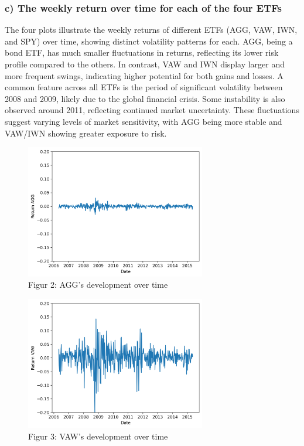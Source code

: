\documentclass{rapport}
\begin{document}
\subsubsection*{\textbf{c)} The weekly return over time for each of the four ETFs}
The four plots illustrate the weekly returns of different ETFs (AGG, VAW, IWN, and SPY) over time, showing distinct volatility patterns for each. 
AGG, being a bond ETF, has much smaller fluctuations in returns, reflecting its lower risk profile compared to the others. 
In contrast, VAW and IWN display larger and more frequent swings, indicating higher potential for both gains and losses. 
A common feature across all ETFs is the period of significant volatility between 2008 and 2009, likely due to the global financial crisis. 
Some instability is also observed around 2011, reflecting continued market uncertainty. 
These fluctuations suggest varying levels of market sensitivity, with AGG being more stable and VAW/IWN showing greater exposure to risk.

\begin{figure}[H]
    \centering
    \includegraphics[width=0.7\textwidth]{figure_2_AGG_development.png}
    \caption{Figur 2: AGG's development over time}
    \label{fig:agg_development}
\end{figure}

\begin{figure}[H]
    \centering
    \includegraphics[width=0.7\textwidth]{figure_VAW_development.png}
    \caption{Figur 3: VAW's development over time}
    \label{fig:vaw_development}
\end{figure}
\end{document}
